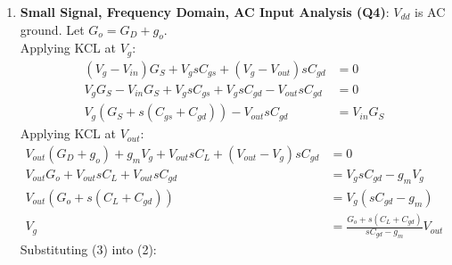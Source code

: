 \begin{enumerate}
\begin{enumerate}
\begin{align*}
        \end{align*}
      \item Triode, \(V_{OUT} < V_{IN} - V_{th}\), with
        \(I_D = K_P \frac{W}{L}\left[(V_{IN} - V_{th}) V_{OUT} - \frac{V_{OUT}^2}{2}\right] = 2 k_n \left[\ldots\right]\)
        and \(V_X = V_{IN} - V_{th}\):
        \begin{align*}
          V_{OUT} &= V_{dd} - \frac{2 k_n}{G_D}\left[ V_X V_{OUT} - \frac{V_{OUT}^2}{2} \right] \\
          V_{OUT} &= V_{dd} - \frac{2 k_n V_X}{G_D} V_{OUT} + \frac{k_n}{G_D} V_{OUT}^2 \\
          \frac{k_n}{G_D} V_{OUT}^2 - \left(1 + \frac{2 k_n V_X}{G_D}\right) V_{OUT} + V_{dd} &= 0 \\
          k_n V_{OUT}^2 - \left(G_D + 2 k_n V_X\right) V_{OUT} + G_D V_{dd} &= 0 \\
          V_{OUT} &= \frac{G_D + 2 k_n V_X - \sqrt{(G_D + 2 k_n V_X)^2 - 4 k_n G_D V_{dd}}}{2 k_n}
        \end{align*}
        taking the smaller root (the larger one gives \(V_{OUT} > V_X\), outside triode).
    \end{enumerate}
    The amplifier is biased in saturation, between
    \(V_{IN} = V_{th}\) and \(V_{IN} = V_{th} + V_{ov,edge}\).
  \item \textbf{Small Signal, Frequency Domain, AC Input Analysis (Q4)}: \(V_{dd}\) is AC ground.
    Let \(G_o = G_D + g_o\).\\
    Applying KCL at \(V_g\):
    \begin{align*}
      (V_g - V_{in})G_S + V_g sC_{gs} + (V_g - V_{out})sC_{gd} &= 0 \\
      V_g G_S - V_{in} G_S + V_g sC_{gs} + V_g sC_{gd} - V_{out} sC_{gd} &= 0 \\
      V_g (G_S + s(C_{gs} + C_{gd})) - V_{out} sC_{gd} &= V_{in} G_S \tag{2}
    \end{align*}
    Applying KCL at \(V_{out}\):
    \begin{align*}
      V_{out}(G_D + g_o) + g_m V_g + V_{out} sC_L + (V_{out} - V_g)sC_{gd} &= 0 \\
      V_{out} G_o + V_{out} sC_L + V_{out} sC_{gd} &= V_g sC_{gd} - g_m V_g \\
      V_{out}(G_o + s(C_L + C_{gd})) &= V_g (sC_{gd} - g_m) \\
      V_g &= \frac{G_o + s(C_L + C_{gd})}{sC_{gd} - g_m} V_{out} \tag{3}
    \end{align*}
    Substituting (3) into (2):

\end{enumerate}

